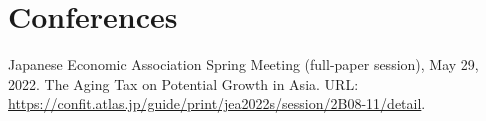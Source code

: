 \newcommand{\playsymbol}{$\blacktriangleright$}

\section{\sc Conferences}
\begin{etaremune}
\item
  Japanese Economic Association Spring Meeting (full-paper session), May 29, 2022. The Aging Tax on Potential Growth in Asia. URL: \url{https://confit.atlas.jp/guide/print/jea2022s/session/2B08-11/detail}.
\end{etaremune}


